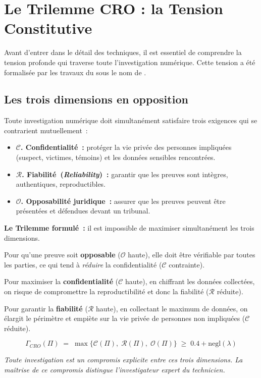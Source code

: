 \section{Le Trilemme CRO : la Tension Constitutive}
\label{sec:trilemme-intro}

Avant d'entrer dans le détail des techniques, il est essentiel de comprendre
la tension profonde qui traverse toute l'investigation numérique. Cette tension
a été formalisée par les travaux du  sous le nom de
 \cite{minka2025cro}.

\subsection{Les trois dimensions en opposition}

Toute investigation numérique doit simultanément satisfaire trois exigences
qui se contrarient mutuellement~:

\begin{itemize}
    \item \textbf{$\mathcal{C}$. Confidentialité~:} protéger la vie privée
          des personnes impliquées (suspect, victimes, témoins) et les données
          sensibles rencontrées.
    \item \textbf{$\mathcal{R}$. Fiabilité~(\textit{Reliability})~:} garantir
          que les preuves sont intègres, authentiques, reproductibles.
    \item \textbf{$\mathcal{O}$. Opposabilité juridique~:} assurer que les
          preuves peuvent être présentées et défendues devant un tribunal.
\end{itemize}

\begin{boxCRO}
\textbf{Le Trilemme formulé~:} il est impossible de maximiser simultanément
les trois dimensions.

\medskip
Pour qu'une preuve soit \textbf{opposable} ($\mathcal{O}$ haute), elle doit
être vérifiable par toutes les parties, ce qui tend à \emph{réduire} la
confidentialité ($\mathcal{C}$ contrainte).

Pour maximiser la \textbf{confidentialité} ($\mathcal{C}$ haute), en
chiffrant les données collectées, on risque de compromettre la
reproductibilité et donc la fiabilité ($\mathcal{R}$ réduite).

Pour garantir la \textbf{fiabilité} ($\mathcal{R}$ haute), en collectant
le maximum de données, on élargit le périmètre et empiète sur la vie
privée de personnes non impliquées ($\mathcal{C}$ réduite).

\[
\Gamma_{CRO}(\Pi) \;=\; \max\bigl\{\mathcal{C}(\Pi),\;
\mathcal{R}(\Pi),\; \mathcal{O}(\Pi)\bigr\}
\;\geq\; 0.4 + \mathrm{negl}(\lambda)
\]

\textit{Toute investigation est un compromis explicite entre ces trois
dimensions. La maîtrise de ce compromis distingue l'investigateur expert
du technicien.}
\end{boxCRO}

